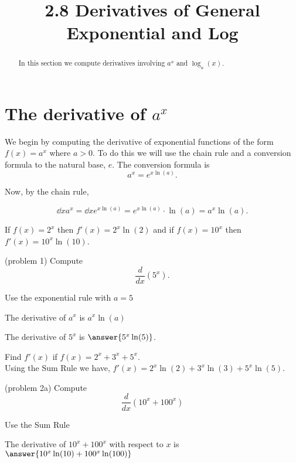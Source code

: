 \documentclass[handout]{ximera}
\title{2.8 Derivatives of General Exponential and Log}
\begin{document}
\begin{abstract}
In this section we compute derivatives involving $a^x$ and $\log_a(x)$.
\end{abstract}

\maketitle




\section{The derivative of $a^x$}



We begin by computing the derivative of exponential functions of the form  $f(x) = a^x$ where $a > 0$. 
To do this we will use the chain rule and a conversion formula to the natural base, $e$.
The conversion formula is 
\[
a^x = e^{x\ln(a)}.
\]

Now, by the chain rule,

\[
\dd{x} a^x = \dd{x} e^{x\ln(a)}  = e^{x\ln(a)}\cdot \ln(a) = a^x \ln(a).
\]



\begin{example}[example 1]
If $f(x) = 2^x$ then $f'(x) = 2^x \ln(2)$
and if $f(x) = 10^x$ then $f'(x) = 10^x \ln(10)$.
\end{example}



\begin{problem}(problem 1)
Compute
\[
\frac{d}{dx} \left(5^x\right).
\]
\begin{hint}
Use the exponential rule with $a = 5$
\end{hint}
\begin{hint}
The derivative of $a^x$ is $a^x\ln(a)$
\end{hint}
The derivative of $5^x$ is $\answer{5^x\ln(5)}$.
\end{problem}




\begin{example}[example 2]
 Find $f'(x)$ if $f(x) = 2^x + 3^x + 5^x.$\\
Using the Sum Rule we have, $f'(x) = 2^x\ln(2) + 3^x\ln(3) + 5^x\ln(5)$.
\end{example}


\begin{problem}(problem 2a)
  Compute 
  \[
  \frac{d}{dx} \left(10^x + 100^x\right)
  \]
  
    \begin{hint}
      Use the Sum Rule
    \end{hint}    
		The derivative of $10^x + 100^x$ with respect to $x$ is
		 $\answer{10^x \ln(10) + 100^x \ln(100)}$
	
\end{problem}
\end{document}
